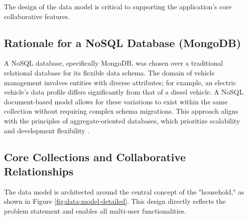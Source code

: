 The design of the data model is critical to supporting the application's core collaborative features.

\subsection{Rationale for a NoSQL Database (MongoDB)}
A NoSQL database, specifically MongoDB, was chosen over a traditional relational database for its flexible data schema. The domain of vehicle management involves entities with diverse attributes; for example, an electric vehicle's data profile differs significantly from that of a diesel vehicle. A NoSQL document-based model allows for these variations to exist within the same collection without requiring complex schema migrations. This approach aligns with the principles of aggregate-oriented databases, which prioritize scalability and development flexibility \cite{Sadalage2012NoSQLDistilled}.

\subsection{Core Collections and Collaborative Relationships}
The data model is architected around the central concept of the "household," as shown in Figure \ref{fig:data-model-detailed}. This design directly reflects the problem statement and enables all multi-user functionalities.

